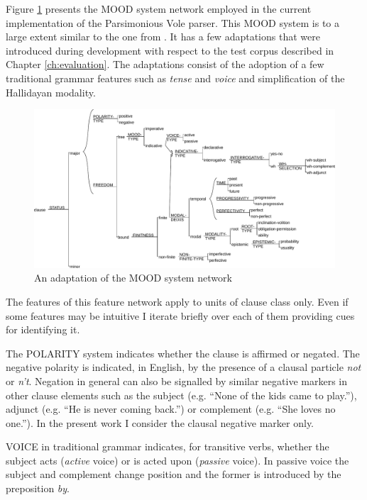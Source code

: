     Figure \ref{fig:clause-mood} presents the MOOD system network employed in the current implementation of the Parsimonious Vole parser. This MOOD system is to a large extent similar to the one from \citet[162]{Halliday2013}. It has a few adaptations that were introduced during development with respect to the test corpus described in Chapter \ref{ch:evaluation}. The adaptations consist of the adoption of a few traditional grammar features such as \textit{tense} and \textit{voice} and simplification of the Hallidayan modality.
        
    \begin{figure}[!ht]
        \centering
        \includegraphics[width=\linewidth]{Figures/SFL-grammar/mood-simplified.pdf}
        \caption{An adaptation of the MOOD system network \citep[162]{Halliday2013}}
        \label{fig:clause-mood}
    \end{figure}

    The features of this feature network apply to units of clause class only. Even if some features may be intuitive I iterate briefly over each of them providing cues for identifying it. 
    
    The POLARITY system indicates whether the clause is affirmed or negated. The negative polarity is indicated, in English, by the presence of a clausal particle \textit{not} or \textit{n't}. Negation in general can also be signalled by similar negative markers in other clause elements such as the subject (e.g. ``None of the kids came to play.''), adjunct (e.g. ``He is never coming back.'') or complement (e.g. ``She loves no one.''). In the present work I consider the clausal negative marker only. 
    
    VOICE in traditional grammar indicates, for transitive verbs, whether the subject acts (\textit{active} voice) or is acted upon (\textit{passive} voice). In passive voice the subject and complement change position and the former is introduced by the preposition \textit{by}. 
    
